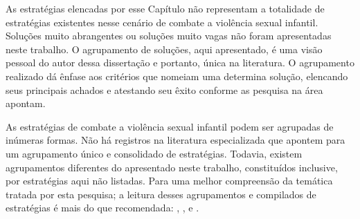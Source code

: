 As estratégias elencadas por esse Capítulo não representam a totalidade de estratégias existentes nesse cenário de combate a violência sexual infantil. Soluções muito abrangentes ou soluções muito vagas não foram apresentadas neste trabalho. O agrupamento de soluções, aqui apresentado, é uma visão pessoal do autor dessa dissertação e portanto, única na literatura. O agrupamento realizado dá ênfase aos critérios que nomeiam uma determina solução, elencando seus principais achados e atestando seu êxito conforme as pesquisa na área apontam.






As estratégias de combate a violência sexual infantil podem ser agrupadas de inúmeras formas. Não há registros na literatura especializada que apontem para um agrupamento único e consolidado de estratégias. Todavia, existem  agrupamentos diferentes do apresentado neste trabalho, constituídos inclusive, por estratégias aqui não listadas. Para uma melhor compreensão da temática tratada por esta pesquisa; a leitura desses agrupamentos e compilados de estratégias é mais do que recomendada: , ,  e .





